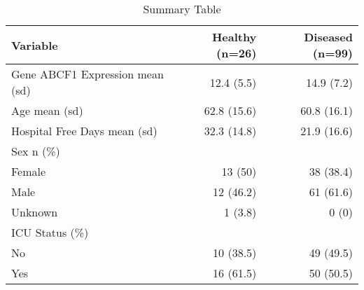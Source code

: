 \begin{table}
\centering
\caption{\label{tab:unnamed-chunk-13}Summary Table}
\centering
\begin{tabular}[t]{lrr}
\toprule
Variable & Healthy (n=26) & Diseased (n=99)\\
\midrule
Gene ABCF1 Expression mean (sd) & 12.4 (5.5) & 14.9 (7.2)\\
Age mean (sd) & 62.8 (15.6) & 60.8 (16.1)\\
Hospital Free Days mean (sd) & 32.3 (14.8) & 21.9 (16.6)\\
Sex n (\%) &  & \\
\hspace{1em}Female & 13 (50) & 38 (38.4)\\
\addlinespace
\hspace{1em}Male & 12 (46.2) & 61 (61.6)\\
\hspace{1em}Unknown & 1 (3.8) & 0 (0)\\
ICU Status (\%) &  & \\
\hspace{1em}No & 10 (38.5) & 49 (49.5)\\
\hspace{1em}Yes & 16 (61.5) & 50 (50.5)\\
\bottomrule
\end{tabular}
\end{table}

